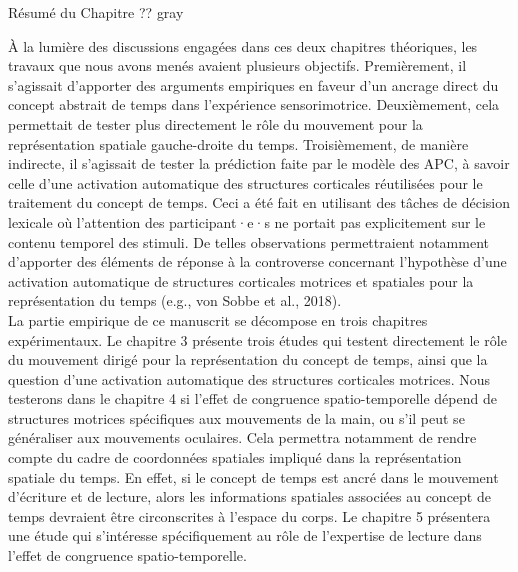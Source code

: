 \documentclass[
  a4paper,12pt,twoside,onecolumn,openright,final,oldfontcommands]{memoir}
\newcommand\chaptercolor{gray}
\newcommand\getcurrentref[1]{
 \ifnumequal{\value{#1}}{0}
  {??}
  {\the\value{#1}}
}
\begin{document}
\begin{vplace}[1]

\begin{summary}{Résumé du Chapitre\getcurrentref{chapter}}{\chaptercolor}

À la lumière des discussions engagées dans ces deux chapitres théoriques, les travaux que nous avons menés avaient plusieurs objectifs. Premièrement, il s'agissait d’apporter des arguments empiriques en faveur d’un ancrage direct du concept abstrait de temps dans l’expérience sensorimotrice. Deuxièmement, cela permettait de tester plus directement le rôle du mouvement pour la représentation spatiale gauche-droite du temps. Troisièmement, de manière indirecte, il s'agissait de tester la prédiction faite par le modèle des APC, à savoir celle d’une activation automatique des structures corticales réutilisées pour le traitement du concept de temps. Ceci a été fait en utilisant des tâches de décision lexicale où l’attention des participant·e·s ne portait pas explicitement sur le contenu temporel des stimuli. De telles observations permettraient notamment d’apporter des éléments de réponse à la controverse concernant l’hypothèse d’une activation automatique de structures corticales motrices et spatiales pour la représentation du temps (e.g., von Sobbe et al., 2018).\\

La partie empirique de ce manuscrit se décompose en trois chapitres expérimentaux. Le chapitre 3 présente trois études qui testent directement le rôle du mouvement dirigé pour la représentation du concept de temps, ainsi que la question d’une activation automatique des structures corticales motrices. Nous testerons dans le chapitre 4 si l’effet de congruence spatio-temporelle dépend de structures motrices spécifiques aux mouvements de la main, ou s’il peut se généraliser aux mouvements oculaires. Cela permettra notamment de rendre compte du cadre de coordonnées spatiales impliqué dans la représentation spatiale du temps. En effet, si le concept de temps est ancré dans le mouvement d'écriture et de lecture, alors les informations spatiales associées au concept de temps devraient être circonscrites à l’espace du corps. Le chapitre 5 présentera une étude qui s’intéresse spécifiquement au rôle de l’expertise de lecture dans l’effet de congruence spatio-temporelle.

\end{summary}

\end{vplace}
\end{document}
